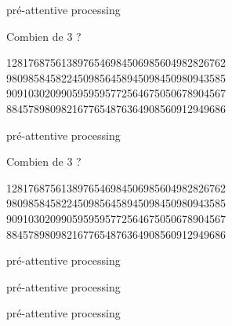 \documentclass[ignorenonframetext,]{beamer}
\begin{document}
\begin{frame}{pré-attentive processing}
\protect\hypertarget{pruxe9-attentive-processing}{}

\begin{block}{Combien de 3 ?}

1281768756138976546984506985604982826762
9809858458224509856458945098450980943585
9091030209905959595772564675050678904567
8845789809821677654876364908560912949686

\end{block}

\end{frame}

\begin{frame}{pré-attentive processing}
\protect\hypertarget{pruxe9-attentive-processing-1}{}

\begin{block}{Combien de 3 ?}

12817687561{3}8976546984506985604982826762
980985845822450985645894509845098094{3}585
90910{3}0209905959595772564675050678904567
8845789809821677654876{3}64908560912949686

\end{block}

\end{frame}

\begin{frame}{{pré-attentive processing}}
\protect\hypertarget{pruxe9-attentive-processing-2}{}

\end{frame}

\begin{frame}{{pré-attentive processing}}
\protect\hypertarget{pruxe9-attentive-processing-3}{}

\end{frame}

\begin{frame}{{pré-attentive processing}}
\protect\hypertarget{pruxe9-attentive-processing-4}{}

\end{frame}

\begin{frame}{}
\protect\hypertarget{section-1}{}

\end{frame}

\begin{frame}{}
\protect\hypertarget{section-2}{}

\end{frame}
\end{document}
